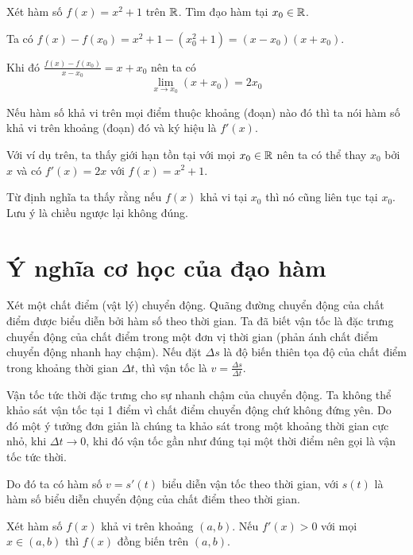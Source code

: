\begin{example}
    Xét hàm số $f(x) = x^2 + 1$ trên $\mathbb{R}$. Tìm đạo hàm tại $x_0 \in \mathbb{R}$.

    Ta có $f(x)-f(x_0) = x^2 + 1 - (x_0^2 + 1) = (x - x_0) (x + x_0)$.

    Khi đó $\frac{f(x)-f(x_0)}{x-x_0} = x + x_0$ nên ta có
    \[ \lim_{x \to x_0} (x + x_0) = 2 x_0 \]
\end{example}

Nếu hàm số khả vi trên mọi điểm thuộc khoảng (đoạn) nào đó thì
ta nói hàm số khả vi trên khoảng (đoạn) đó và ký hiệu là $f'(x)$.

Với ví dụ trên, ta thấy giới hạn tồn tại với mọi $x_0 \in \mathbb{R}$ nên ta có thể
thay $x_0$ bởi $x$ và có $f'(x) = 2x$ với $f(x) = x^2 + 1$.

\begin{remark}
    Từ định nghĩa ta thấy rằng nếu $f(x)$ khả vi tại $x_0$ thì nó cũng liên tục tại $x_0$.
    Lưu ý là chiều ngược lại không đúng.
\end{remark}

\section{Ý nghĩa cơ học của đạo hàm}

Xét một chất điểm (vật lý) chuyển động. Quãng đường chuyển động của chất điểm được 
biểu diễn bởi hàm số theo thời gian. Ta đã biết vận tốc là đặc trưng chuyển động của 
chất điểm trong một đơn vị thời gian (phản ánh chất điểm chuyển động nhanh hay chậm).
Nếu đặt $\Delta s$ là độ biến thiên tọa độ của chất điểm trong khoảng thời gian $\Delta t$,
thì vận tốc là $v = \frac{\Delta s}{\Delta t}$.

Vận tốc tức thời đặc trưng cho sự nhanh chậm của chuyển động.
Ta không thể khảo sát vận tốc tại 1 điểm vì chất điểm chuyển động
chứ không đứng yên. Do đó một ý tưởng đơn giản là chúng ta khảo sát
trong một khoảng thời gian cực nhỏ, khi $\Delta t \to 0$, khi đó
vận tốc gần như đúng tại một thời điểm nên gọi là vận tốc tức thời.

Do đó ta có hàm số $v = s'(t)$ biểu diễn vận tốc theo thời gian, 
với $s(t)$ là hàm số biểu diễn chuyển động của chất điểm theo thời gian.

\begin{theorem}
    Xét hàm số $f(x)$ khả vi trên khoảng $(a, b)$. Nếu $f'(x) > 0$ 
    với mọi $x \in (a, b)$ thì $f(x)$ đồng biến trên $(a, b)$.
\end{theorem}

